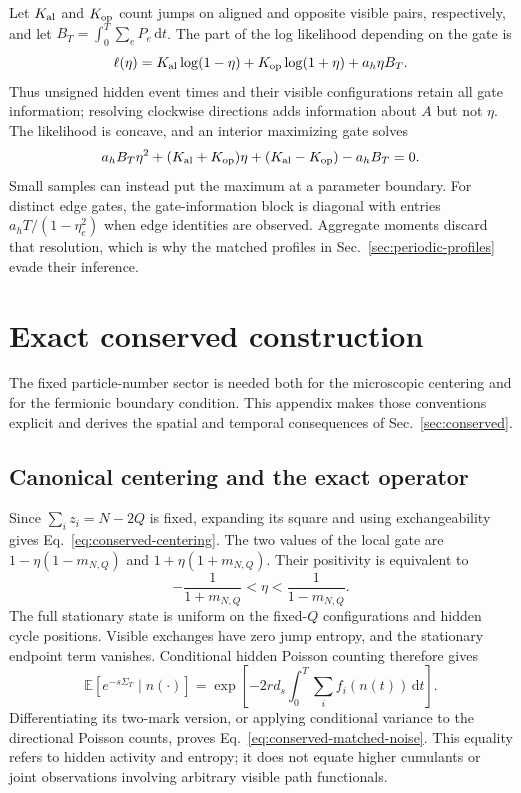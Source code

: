 \documentclass[aps,pre,reprint,amsmath,amssymb,longbibliography,floatfix]{revtex4-2}
\newcommand{\E}{\mathbb E}
\newcommand{\dd}{\,\mathrm d}
\begin{document}
Let $K_{\rm al}$ and $K_{\rm op}$ count jumps on aligned and opposite visible pairs,
respectively, and let $B_T=\int_0^T\sum_eP_e\dd t$.
The part of the log likelihood depending on the gate is
\begin{equation}
 \ell(\eta)=K_{\rm al}\log(1-\eta)+K_{\rm op}\log(1+\eta)+a_h\eta B_T.
 \label{eq:gate-sufficient}
\end{equation}
Thus unsigned hidden event times and their visible configurations
retain all gate information; resolving clockwise directions adds
information about $A$ but not $\eta$. The likelihood is concave, and
an interior maximizing gate solves
\begin{equation}
 a_h B_T\eta^2+(K_{\rm al}+K_{\rm op})\eta
 +(K_{\rm al}-K_{\rm op})-a_h B_T=0.
 \label{eq:gate-likelihood-equation}
\end{equation}
Small samples can instead put the maximum at a parameter boundary.
For distinct edge gates, the gate-information block is diagonal with
entries $a_hT/(1-\eta_e^2)$ when edge identities are observed. Aggregate
moments discard that resolution, which is why the matched profiles in
Sec.~\ref{sec:periodic-profiles} evade their inference.

\section{Exact conserved construction}
\label{app:conserved}
The fixed particle-number sector is needed both for the microscopic
centering and for the fermionic boundary condition. This appendix makes
those conventions explicit and derives the spatial and temporal
consequences of Sec.~\ref{sec:conserved}.

\subsection{Canonical centering and the exact operator}
Since $\sum_i z_i=N-2Q$ is fixed, expanding its square and using
exchangeability gives Eq.~\eqref{eq:conserved-centering}. The two values
of the local gate are $1-\eta(1-m_{N,Q})$ and
$1+\eta(1+m_{N,Q})$. Their positivity is equivalent to
\begin{equation}
 -\frac1{1+m_{N,Q}}<\eta<\frac1{1-m_{N,Q}}.
 \label{eq:conserved-positivity}
\end{equation}
The full stationary state is uniform on the fixed-$Q$ configurations
and hidden cycle positions. Visible exchanges have zero jump entropy,
and the stationary endpoint term vanishes. Conditional hidden Poisson
counting therefore gives
\begin{equation}
 \E\left[e^{-s\Sigma_T}\mid n(\cdot)\right]
 =\exp\left[-2rd_s\int_0^T\sum_i f_i(n(t))\dd t\right].
 \label{eq:conserved-conditional}
\end{equation}
Differentiating its two-mark version, or applying conditional variance
to the directional Poisson counts, proves
Eq.~\eqref{eq:conserved-matched-noise}. This equality refers to hidden
activity and entropy; it does not equate higher cumulants or joint
observations involving arbitrary visible path functionals.
\end{document}
